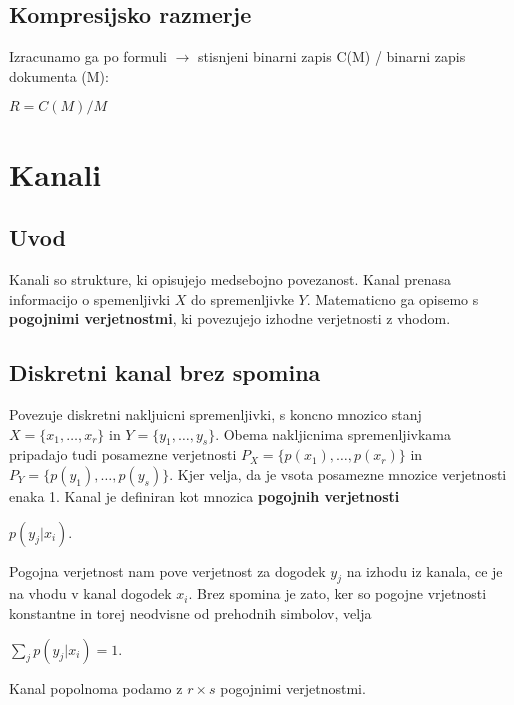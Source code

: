 \documentclass{article}
\begin{document}
\begin{multicols}{3}
\subsection{Kompresijsko razmerje}
Izracunamo ga po formuli $\rightarrow$ stisnjeni binarni zapis C(M) / binarni zapis dokumenta (M):
\begin{center}
    \begin{math}
        R = C(M) / M
    \end{math}
\end{center}

\section{Kanali}

\subsection{Uvod}
Kanali so strukture, ki opisujejo medsebojno povezanost. Kanal prenasa informacijo o spemenljivki
$X$ do spremenljivke $Y$. Matematicno ga opisemo s \textbf{pogojnimi verjetnostmi}, ki povezujejo izhodne
verjetnosti z vhodom.

\subsection{Diskretni kanal brez spomina}
Povezuje diskretni nakljuicni spremenljivki, s koncno mnozico stanj $X=\{x_1, \dots, x_r\}$ in $Y=\{y_1, \dots, y_s\}$.
Obema nakljicnima spremenljivkama pripadajo tudi posamezne verjetnosti $P_X = \{p(x_1), \dots, p(x_r)\}$ in $P_Y = \{p(y_1), \dots, p(y_s)\}$. Kjer velja, da je vsota posamezne mnozice verjetnosti enaka 1. Kanal je definiran kot mnozica \textbf{pogojnih verjetnosti}
\begin{center}
    $p(y_j | x_i)$.
\end{center}
Pogojna verjetnost nam pove verjetnost za dogodek $y_j$ na izhodu iz kanala, ce je na vhodu v kanal dogodek $x_i$.
Brez spomina je zato, ker so pogojne vrjetnosti konstantne in torej neodvisne od prehodnih simbolov, velja
\begin{center}
    \begin{math}
        \sum_j p(y_j | x_i) = 1.
    \end{math} 
\end{center}
Kanal popolnoma podamo z $r \times s$ pogojnimi verjetnostmi.


\end{multicols}
\end{document}

